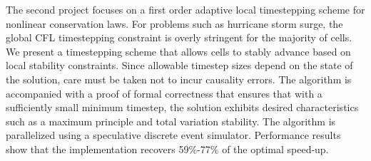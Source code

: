     The second project focuses on a first order adaptive local timestepping scheme for nonlinear conservation laws. For problems such as hurricane storm surge, the global CFL timestepping constraint is overly stringent for the majority of cells. We present a timestepping scheme that allows cells to stably advance based on local stability constraints. Since allowable timestep sizes depend on the state of the solution, care must be taken not to incur causality errors. The algorithm is accompanied with a proof of formal correctness that ensures that with a sufficiently small minimum timestep, the solution exhibits desired characteristics such as a maximum principle and total variation stability. The algorithm is parallelized using a speculative discrete event simulator. Performance results show that the implementation recovers 59\%-77\% of the optimal speed-up.
